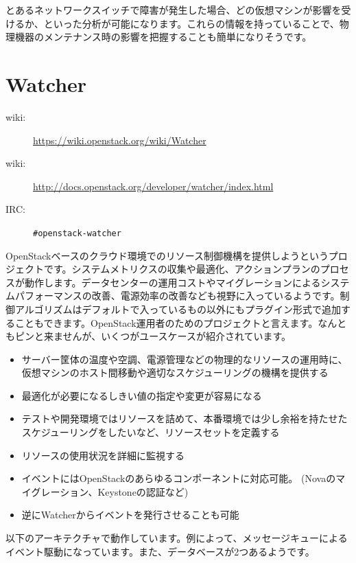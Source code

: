 とあるネットワークスイッチで障害が発生した場合、どの仮想マシンが影響を受けるか、といった分析が可能になります。これらの情報を持っていることで、物理機器のメンテナンス時の影響を把握することも簡単になりそうです。

\section{Watcher}

\begin{description}
	\item[wiki:] \url{https://wiki.openstack.org/wiki/Watcher}
	\item[wiki:] \url{http://docs.openstack.org/developer/watcher/index.html}
	\item[IRC:] \verb|#openstack-watcher|
\end{description}

OpenStackベースのクラウド環境でのリソース制御機構を提供しようというプロジェクトです。システムメトリクスの収集や最適化、アクションプランのプロセスが動作します。データセンターの運用コストやマイグレーションによるシステムパフォーマンスの改善、電源効率の改善なども視野に入っているようです。制御アルゴリズムはデフォルトで入っているもの以外にもプラグイン形式で追加することもできます。OpenStack運用者のためのプロジェクトと言えます。なんともピンと来ませんが、いくつがユースケースが紹介されています。

\begin{itemize}
	\item サーバー筐体の温度や空調、電源管理などの物理的なリソースの運用時に、仮想マシンのホスト間移動や適切なスケジューリングの機構を提供する
	\item 最適化が必要になるしきい値の指定や変更が容易になる
	\item テストや開発環境ではリソースを詰めて、本番環境では少し余裕を持たせたスケジューリングをしたいなど、リソースセットを定義する
	\item リソースの使用状況を詳細に監視する
	\item イベントにはOpenStackのあらゆるコンポーネントに対応可能。 (Novaのマイグレーション、Keystoneの認証など)
	\item 逆にWatcherからイベントを発行させることも可能
\end{itemize}

以下のアーキテクチャで動作しています。例によって、メッセージキューによるイベント駆動になっています。また、データベースが2つあるようです。

